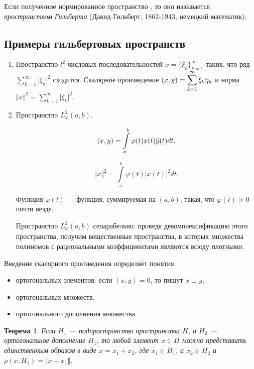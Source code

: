 \documentclass[12pt,a4paper,titlepage,oneside]{book}
\newcommand{\overbar}[1]{\mkern 1.5mu\overline{\mkern-1.5mu#1\mkern-1.5mu}\mkern 1.5mu}
\theoremstyle{definition}
\theoremstyle{plain}
\newtheorem*{theorem}{Теорема}
\theoremstyle{break}
\theoremstyle{remark}
\theoremstyle{remark}
\theoremstyle{remark}
\theoremstyle{remark}
\theoremstyle{plain}
\theoremstyle{plain}
\begin{document}
Если полученное нормированное пространство , то оно называется \textit{пространством Гильберта} (Давид Гильберт, 1862-1943, немецкий математик).

\subsection*{Примеры гильбертовых пространств}

\begin{enumerate}
	\item Пространство $l^2$ числовых последовательностей $x = \lbrace \xi_k \rbrace_{k=1}^{\infty}$ таких, что ряд $\displaystyle\sum_{k=1}^{\infty} \lvert \xi_k \rvert^2$ сходится. Скалярное произведение $(x, y) = \displaystyle\sum_{k=1}^{\infty} \xi_k \overbar{\eta}_k$ и норма $\Vert x \Vert^2 = \displaystyle\sum_{k=1}^{\infty} \lvert \xi_k \rvert^2$.
	
	\item Пространство $L_{\varphi}^2 (a, b)$.
	
	$$ (x, y) = \displaystyle\int\limits_a^b \varphi(t) x(t) \overbar{y}(t) dt,$$
	
	$$ \Vert x \Vert^2 = \displaystyle\int\limits_a^b \varphi(t) \lvert x(t) \rvert^2 dt.$$
	
	Функция $\varphi(t)$ --- функция, суммируемая на $(a, b)$, такая, что $\varphi(t) > 0$ почти везде.
	
	Пространство $L_{\varphi}^2 (a, b)$ сепарабельно: проведя декомплексификацию этого пространства, получим вещественные пространства, в которых множества полиномов с рациональными коэффициентами являются всюду плотными.
\end{enumerate}

Введение скалярного произведения определяет понятия:

\begin{itemize}
	\item ортогональных элементов: если $(x, y) = 0$, то пишут $x \perp y$,
	
	\item ортогональных множеств,
	
	\item ортогонального дополнения множества.
\end{itemize}

\begin{theorem}
	Если $H_1$ --- подпространство пространства $H$, а $H_2$ --- ортогональное дополнение $H_1$, то любой элемент $x \in H$ можно представить единственным образом в виде $x = x_1 + x_2$, где $x_1 \in H_1$, а $x_2 \in H_2$ и $\rho(x, H_1) = \Vert x - x_1 \Vert$.
\end{theorem}
\end{document}
